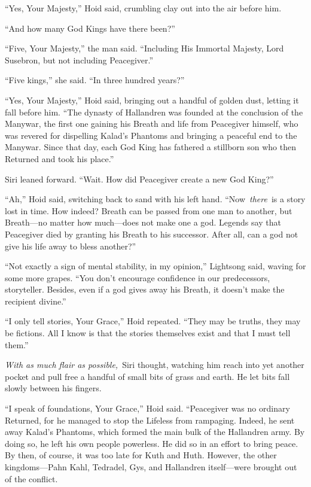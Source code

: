 “Yes, Your Majesty,” Hoid said, crumbling clay out into the air before him.

“And how many God Kings have there been?”

“Five, Your Majesty,” the man said. “Including His Immortal Majesty, Lord Susebron, but not including Peacegiver.”

“Five kings,” she said. “In three hundred years?”

“Yes, Your Majesty,” Hoid said, bringing out a handful of golden dust, letting it fall before him. “The dynasty of Hallandren was founded at the conclusion of the Manywar, the first one gaining his Breath and life from Peacegiver himself, who was revered for dispelling Kalad’s Phantoms and bringing a peaceful end to the Manywar. Since that day, each God King has fathered a stillborn son who then Returned and took his place.”

Siri leaned forward. “Wait. How did Peacegiver create a new God King?”

“Ah,” Hoid said, switching back to sand with his left hand. “Now~\textit{there}~is a story lost in time. How indeed? Breath can be passed from one man to another, but Breath—no matter how much—does not make one a god. Legends say that Peacegiver died by granting his Breath to his successor. After all, can a god not give his life away to bless another?”

“Not exactly a sign of mental stability, in my opinion,” Lightsong said, waving for some more grapes. “You don’t encourage confidence in our predecessors, storyteller. Besides, even if a god gives away his Breath, it doesn’t make the recipient divine.”

“I only tell stories, Your Grace,” Hoid repeated. “They may be truths, they may be fictions. All I know is that the stories themselves exist and that I must tell them.”

\textit{With as much flair as possible,}~Siri thought, watching him reach into yet another pocket and pull free a handful of small bits of grass and earth. He let bits fall slowly between his fingers.

“I speak of foundations, Your Grace,” Hoid said. “Peacegiver was no ordinary Returned, for he managed to stop the Lifeless from rampaging. Indeed, he sent away Kalad’s Phantoms, which formed the main bulk of the Hallandren army. By doing so, he left his own people powerless. He did so in an effort to bring peace. By then, of course, it was too late for Kuth and Huth. However, the other kingdoms—Pahn Kahl, Tedradel, Gys, and Hallandren itself—were brought out of the conflict.

